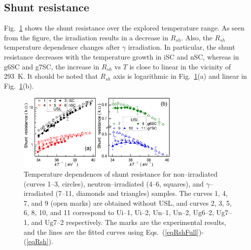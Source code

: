 \documentclass[aip,jap, amsmath,amssymb,reprint]{revtex4-1}
\begin{document}
\subsection{Shunt resistance\label{Rsh}}
Fig.~\ref{fig_Rsh} shows the  shunt resistance  over the explored temperature range.
As seen from the figure, the irradiation results in a decrease in $R_{sh}$.
Also, the $R_{sh}$ temperature dependence changes after $\gamma$ irradiation.
In particular,  the shunt resistance decreases with the temperature growth in iSC and nSC,
whereas in g6SC and g7SC, the increase in $R_{sh}$ vs $T$  is close to linear in the vicinity of 293~K.
It should be noted that $R_{sh}$ axis is logarithmic in Fig.~\ref{fig_Rsh}(a) and linear in Fig.~\ref{fig_Rsh}(b).


\begin{figure}
\includegraphics[width=0.7\textwidth]{fig_9ab}%
\caption{\label{fig_Rsh}
Temperature dependences of shunt resistance for non--irradiated (curves 1--3, circles),
neutron--irradiated (4--6, squares), and $\gamma$--irradiated (7--11, diamonds and triangles) samples.
The curves 1, 4, 7, and 9 (open marks) are obtained without USL,
and curves 2, 3, 5, 6, 8, 10, and 11 correspond to
Ui--1, Ui--2, Un--1, Un--2, Ug6--2, Ug7--1, and Ug7--2 respectively.
The marks are the experimental results, and the lines are the fitted curves using Eqs.~(\ref{eqRshFull})-(\ref{eqRsh}).
}%
\end{figure}
\end{document}
